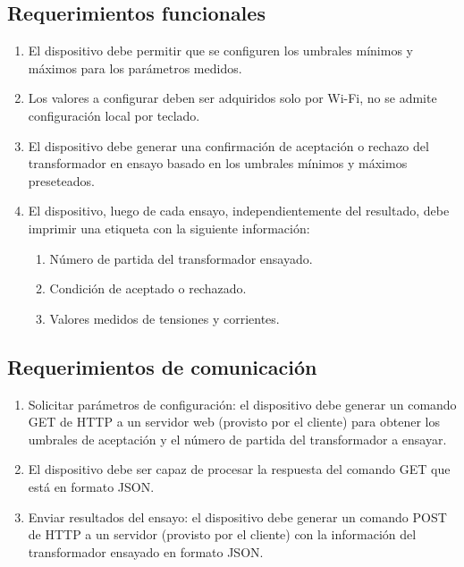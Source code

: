 \subsection{Requerimientos funcionales}
\label{subsec:ReqFun}
	\begin{enumerate}
	\item El dispositivo debe permitir que se configuren los umbrales mínimos y máximos para los parámetros medidos. 
	\item Los valores a configurar deben ser adquiridos solo por Wi-Fi, no se admite configuración local por teclado.
	\item El dispositivo debe generar una confirmación de aceptación o rechazo del transformador en ensayo basado en los umbrales mínimos y máximos preseteados.
	\item El dispositivo, luego de cada ensayo, independientemente del resultado, debe imprimir una etiqueta con la siguiente información:
		\begin{enumerate}
		\item Número de partida del transformador ensayado.
		\item Condición de aceptado o rechazado.
		\item Valores medidos de tensiones y corrientes.
		\end{enumerate}
	\end{enumerate}	
\subsection{Requerimientos de comunicación}
\label{subsec:ReqCom}
	\begin{enumerate}
	\item Solicitar parámetros de configuración: el dispositivo debe generar un comando GET de HTTP a un servidor web (provisto por el cliente) para obtener los umbrales de aceptación y el número de partida del transformador a ensayar.
	\item El dispositivo debe ser capaz de procesar la respuesta del comando GET que está en formato JSON.
	\item Enviar resultados del ensayo: el dispositivo debe generar un comando POST de HTTP a un servidor (provisto por el cliente) con la información del transformador ensayado en formato JSON.
	\end{enumerate}
